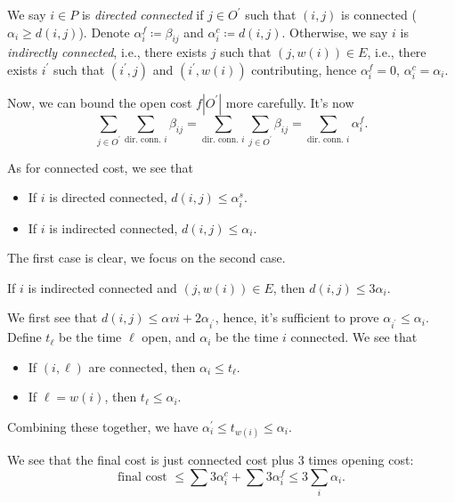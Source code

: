We say \(i\in P\) is \emph{directed connected } if \(j\in O^\prime \) such that \((i, j)\) is connected (\(\alpha _{i} \geq d(i, j)\)). Denote \(\alpha _i^f \coloneqq \beta _{ij}\) and \(\alpha _i^c\coloneqq d(i, j)\). Otherwise, we say \(i\) is \emph{indirectly connected}, i.e., there exists \(j\) such that \((j, w(i))\in E\), i.e., there exists \(i^\prime \) such that \((i^\prime , j)\) and \((i^\prime , w(i))\) contributing, hence \(\alpha _i^f = 0\), \(\alpha _i^c = \alpha _i\).

Now, we can bound the open cost \(f\left\vert O^\prime  \right\vert \) more carefully. It's now
\[
	\sum_{j\in O^\prime } \sum_{\text{dir. conn. }i} \beta _{ij} = \sum_{\text{dir. conn. }i} \sum_{j\in O^\prime} \beta _{ij} = \sum_{\text{dir. conn. }i} \alpha _i^f.
\]

As for connected cost, we see that
\begin{itemize}
	\item If \(i\) is directed connected, \(d(i, j) \leq \alpha _i^s\).
	\item If \(i\) is indirected connected, \(d(i, j) \leq \alpha _i\).
\end{itemize}

The first case is clear, we focus on the second case.

\begin{claim}
	If \(i\) is indirected connected and \((j, w(i))\in E\), then \(d(i, j) \leq 3 \alpha _i\).
\end{claim}
\begin{explanation}
	We first see that \(d(i, j) \leq \alpha vi + 2\alpha _{i^\prime }\), hence, it's sufficient to prove \(\alpha _{i^\prime } \leq \alpha _i\). Define \(t_{\ell } \) be the time \(\ell \) open, and \(\alpha _i\) be the time \(i\) connected. We see that
	\begin{itemize}
		\item If \((i, \ell )\) are connected, then \(\alpha _i \leq t_{\ell } \).
		\item If \(\ell =w(i)\), then \(t_{\ell } \leq \alpha _i\).
	\end{itemize}
	Combining these together, we have \(\alpha _i ^\prime \leq t_{w(i)} \leq \alpha _i\).
\end{explanation}

We see that the final cost is just connected cost plus \(3\) times opening cost:
\[
	\text{final cost } \leq \sum 3 \alpha _i^c + \sum 3 \alpha _i^f \leq 3 \sum_{i} \alpha _i.
\]
